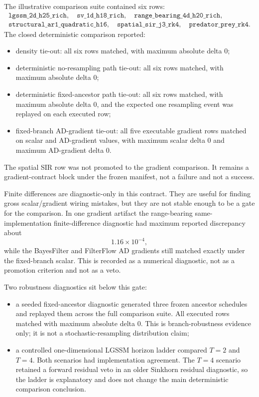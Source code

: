 The illustrative comparison suite contained six rows:
\[
\begin{gathered}
\texttt{lgssm\_2d\_h25\_rich},\quad
\texttt{sv\_1d\_h18\_rich},\quad
\texttt{range\_bearing\_4d\_h20\_rich},\\
\texttt{structural\_ar1\_quadratic\_h16},\quad
\texttt{spatial\_sir\_j3\_rk4},\quad
\texttt{predator\_prey\_rk4}.
\end{gathered}
\]
The closed deterministic comparison reported:
\begin{itemize}
  \item density tie-out: all six rows matched, with maximum absolute delta
    \(0\);
  \item deterministic no-resampling path tie-out: all six rows matched, with
    maximum absolute delta \(0\);
  \item deterministic fixed-ancestor path tie-out: all six rows matched, with
    maximum absolute delta \(0\), and the expected one resampling event was
    replayed on each executed row;
  \item fixed-branch AD-gradient tie-out: all five executable gradient rows
    matched on scalar and AD-gradient values, with maximum scalar delta \(0\)
    and maximum AD-gradient delta \(0\).
\end{itemize}
The spatial SIR row was not promoted to the gradient comparison.  It remains a
gradient-contract block under the frozen manifest, not a failure and not a
success.

Finite differences are diagnostic-only in this contract.  They are useful for
finding gross scalar/gradient wiring mistakes, but they are not stable enough
to be a gate for the comparison.  In one gradient artifact the
range-bearing same-implementation finite-difference diagnostic had maximum
reported discrepancy about
\[
  1.16\times 10^{-4},
\]
while the BayesFilter and FilterFlow AD gradients still matched exactly under
the fixed-branch scalar.  This is recorded as a numerical diagnostic, not as a
promotion criterion and not as a veto.

Two robustness diagnostics sit below this gate:
\begin{itemize}
  \item a seeded fixed-ancestor diagnostic generated three frozen ancestor
    schedules and replayed them across the full comparison suite.  All executed
    rows matched with maximum absolute delta \(0\).  This is branch-robustness
    evidence only; it is not a stochastic-resampling distribution claim;
  \item a controlled one-dimensional LGSSM horizon ladder compared \(T=2\) and
    \(T=4\).  Both scenarios had implementation agreement.  The \(T=4\)
    scenario retained a forward residual veto in an older Sinkhorn residual
    diagnostic, so the ladder is explanatory and does not change the main
    deterministic comparison conclusion.
\end{itemize}

